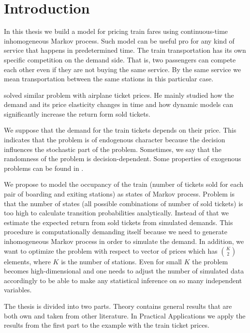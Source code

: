 \chapter*{Introduction}


In this thesis we build a model for pricing train fares using continuous-time inhomogeneous Markov process. Such model can be useful pro for any kind of service that happens in predetermined time. The train transportation has its own specific competition on the demand side. That is, two passengers can compete each other even if they are not buying the same service. By the same service we mean transportation between the same stations in this particular case.

\cite{Williams13} solved similar problem with airplane ticket prices. He mainly studied how the demand and its price elasticity changes in time and how dynamic models can significantly increase the return form sold tickets.

We suppose that the demand for the train tickets depends on their price. This indicates that the problem is of endogenous character because the decision influences the stochastic part of the problem. Sometimes, we say that the randomness of the problem is decision-dependent. Some properties of exogenous problems can be found in \cite{Dupacova06}.

We propose to model the occupancy of the train (number of tickets sold for each pair of boarding and exiting stations) as states of Markov process. Problem is that the number of states (all possible combinations of number of sold tickets) is too high to calculate transition probabilities analytically. Instead of that we estimate the expected return from sold tickets from simulated demands. This procedure is computationally demanding itself because we need to generate inhomogeneous Markov process in order to simulate the demand. In addition, we want to optimize the problem with respect to vector of prices which has $\binom{K}{2}$ elements, where $K$ is the number of stations. Even for small $K$ the problem becomes high-dimensional and one needs to adjust the number of simulated data accordingly to be able to make any statistical inference on so many independent variables.

The thesis is divided into two parts. Theory contains general results that are both own and taken from other literature. In Practical Applications we apply the results from the first part to the example with the train ticket prices.

